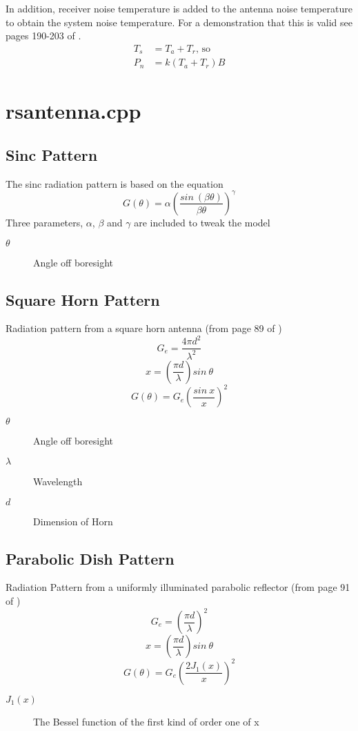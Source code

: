 \documentclass[a4paper,10pt]{article}
\begin{document}
\par
In addition, receiver noise temperature is added to the antenna noise temperature to obtain the system noise temperature. For a demonstration that this is valid see pages 190-203 of \cite{stremler}.
\begin{align}
T_s &= T_a + T_r{\text{, so}} \\
P_n &= k (T_a+T_r) B
\end{align}


\section{rsantenna.cpp}

\subsection{Sinc Pattern}
The sinc radiation pattern is based on the equation
\begin{equation}
G(\theta)=\alpha\left(\frac{sin~(\beta\theta)}{\beta\theta}\right)^\gamma
\end{equation}
Three parameters, $\alpha$, $\beta$ and $\gamma$ are included to tweak the model
\begin{description}
 \item[$\theta$] Angle off boresight
\end{description}

\subsection{Square Horn Pattern}
Radiation pattern from a square horn antenna (from page 89 of \cite{gagli86})
$$G_e=\frac{4\pi d^2}{\lambda^2}$$
$$x = \left(\frac{\pi d}{\lambda}\right)sin~\theta$$
$$G(\theta) = G_e\left(\frac{sin~x}{x}\right)^2$$
\begin{description}
 \item[$\theta$] Angle off boresight
\item[$\lambda$] Wavelength
\item[$d$] Dimension of Horn
\end{description}

\subsection{Parabolic Dish Pattern}
Radiation Pattern from a uniformly illuminated parabolic reflector (from page 91 of \cite{gagli86})
$$G_e=\left(\frac{\pi d}{\lambda}\right)^2$$
$$x = \left(\frac{\pi d}{\lambda}\right)sin~\theta$$
$$G(\theta) = G_e\left(\frac{2 J_1(x)}{x}\right)^2$$
\begin{description}
 \item[$J_1(x)$] The Bessel function of the first kind of order one of x
\end{description}
\end{document}
